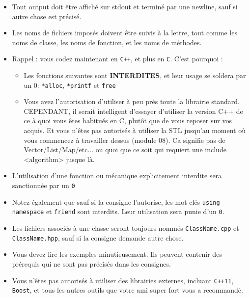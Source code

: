 \begin{itemize}
		\item Tout output doit être affiché sur stdout et terminé par une newline,
            sauf si autre chose est précisé.
		\item Les noms de fichiers imposés doivent être suivis à la lettre,
            tout comme les noms de classe, les noms de fonction, et les 
            noms de méthodes.
		\item Rappel : vous codez maintenant en \texttt{C++}, et plus en
            \texttt{C}. C'est pourquoi :
            \begin{itemize}
                \item Les fonctions suivantes sont \textbf{INTERDITES}, et 
                    leur usage se soldera par un 0: \texttt{*alloc}, 
                    \texttt{*printf} et \texttt{free}
                \item Vous avez l'autorisation d'utiliser à peu près toute 
                    la librairie standard. CEPENDANT, il serait intelligent
                    d'essayer d'utiliser la version C++ de ce à quoi vous êtes
                    habitués en C, plutôt que de vous reposer sur vos acquis.
                    Et vous n'êtes pas autorisés à utiliser la STL jusqu'au 
                    moment où vous commencez à travailler dessus (module 08).
                    Ca signifie pas de Vector/List/Map/etc... ou quoi que 
                    ce soit qui requiert une include <algorithm> jusque là.
		  \end{itemize}
        \item L'utilisation d'une fonction ou mécanique explicitement interdite 
          sera sanctionnée par un \texttt{0}
        \item Notez également que sauf si la consigne l'autorise, les mot-clés
          \texttt{using namespace} et \texttt{friend} sont interdits.
          Leur utilisation sera punie d'un \texttt{0}.
        \item Les fichiers associés à une classe seront toujours nommés \texttt{ClassName.cpp}
          et \texttt{ClassName.hpp}, sauf si la consigne demande autre chose.
        \item Vous devez lire les exemples minutieusement. Ils peuvent contenir
          des prérequis qui ne sont pas précisés dans les consignes.
        \item Vous n'êtes pas autorisés à utiliser des librairies externes,
          incluant \texttt{C++11}, \texttt{Boost}, et tous les autres outils
          que votre ami super fort vous a recommandé.

\end{itemize}
